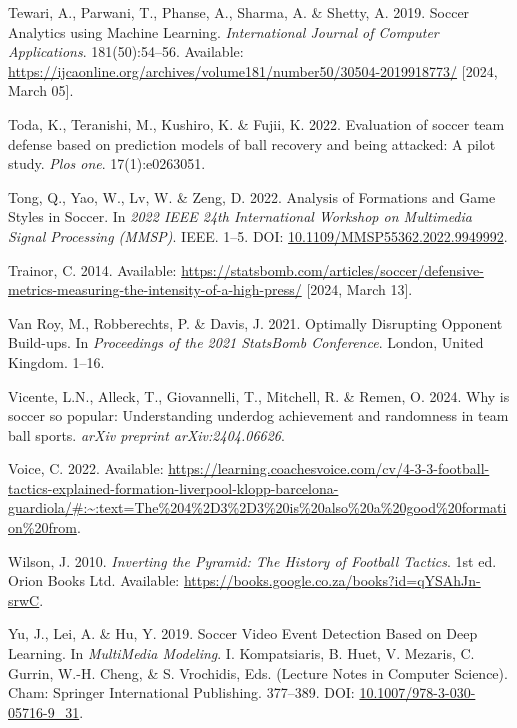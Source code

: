 \documentclass[
  a4paper,
  twoside]{uoe-thesis-template}
\newlength{\cslhangindent}
\newenvironment{CSLReferences}[2] %
 {\begin{list}{}{%
  \setlength{\itemindent}{0pt}
  \setlength{\leftmargin}{0pt}
  \setlength{\parsep}{0pt}
  \ifodd #1
   \setlength{\leftmargin}{\cslhangindent}
   \setlength{\itemindent}{-1\cslhangindent}
  \fi
  \setlength{\itemsep}{#2\baselineskip}}}
 {\end{list}}
\begin{document}
\begin{CSLReferences}{0}{0}
Tewari, A., Parwani, T., Phanse, A., Sharma, A. \& Shetty, A. 2019.
Soccer {Analytics} using {Machine} {Learning}. \emph{International
Journal of Computer Applications}. 181(50):54--56. Available:
\url{https://ijcaonline.org/archives/volume181/number50/30504-2019918773/}
{[}2024, March 05{]}.

Toda, K., Teranishi, M., Kushiro, K. \& Fujii, K. 2022. Evaluation of
soccer team defense based on prediction models of ball recovery and
being attacked: {A} pilot study. \emph{Plos one}. 17(1):e0263051.

Tong, Q., Yao, W., Lv, W. \& Zeng, D. 2022. Analysis of {Formations} and
{Game} {Styles} in {Soccer}. In \emph{2022 {IEEE} 24th {International}
{Workshop} on {Multimedia} {Signal} {Processing} ({MMSP})}. IEEE. 1--5.
DOI:
\href{https://doi.org/10.1109/MMSP55362.2022.9949992}{10.1109/MMSP55362.2022.9949992}.

Trainor, C. 2014. Available:
\url{https://statsbomb.com/articles/soccer/defensive-metrics-measuring-the-intensity-of-a-high-press/}
{[}2024, March 13{]}.

Van Roy, M., Robberechts, P. \& Davis, J. 2021. Optimally {Disrupting}
{Opponent} {Build}-ups. In \emph{Proceedings of the 2021 {StatsBomb}
{Conference}}. London, United Kingdom. 1--16.

Vicente, L.N., Alleck, T., Giovannelli, T., Mitchell, R. \& Remen, O.
2024. Why is soccer so popular: {Understanding} underdog achievement and
randomness in team ball sports. \emph{arXiv preprint arXiv:2404.06626}.

Voice, C. 2022. Available:
\url{https://learning.coachesvoice.com/cv/4-3-3-football-tactics-explained-formation-liverpool-klopp-barcelona-guardiola/\#:~:text=The\%204\%2D3\%2D3\%20is\%20also\%20a\%20good\%20formation\%20from}.

Wilson, J. 2010. \emph{Inverting the {Pyramid}: {The} {History} of
{Football} {Tactics}}. 1st ed. Orion Books Ltd. Available:
\url{https://books.google.co.za/books?id=qYSAhJn-srwC}.

Yu, J., Lei, A. \& Hu, Y. 2019. Soccer {Video} {Event} {Detection}
{Based} on {Deep} {Learning}. In \emph{{MultiMedia} {Modeling}}. I.
Kompatsiaris, B. Huet, V. Mezaris, C. Gurrin, W.-H. Cheng, \& S.
Vrochidis, Eds. (Lecture {Notes} in {Computer} {Science}). Cham:
Springer International Publishing. 377--389. DOI:
\href{https://doi.org/10.1007/978-3-030-05716-9_31}{10.1007/978-3-030-05716-9\_31}.


\end{CSLReferences}
\end{document}
